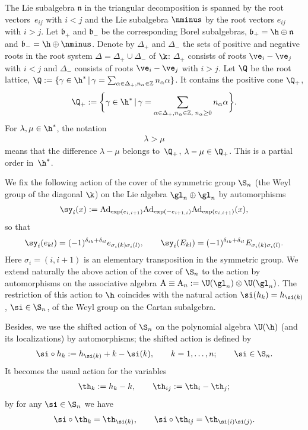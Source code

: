 \documentclass[11pt]{article}
\def\a{\alpha}\def\Ar{{\rm A}}\def\Ab{\bar{\rm A}}\def\b{\beta}\def\bb{\mathfrak{b}}
\def\nplus{\mathfrak{n}}\def\nn{\nonumber}\def\nin{\noindent}
\newcommand{\ZZ}{{\mathbb Z}}\def\Hom{\operatorname{Hom}}\def\I{\mathrm{I}}
\numberwithin{equation}{section}
\begin{document}
The Lie subalgebra $\nplus$ in the triangular decomposition  is spanned by the root vectors~$e_{ij}$ with $i<j$ and the Lie subalgebra $\nminus$ by the
root vectors $e_{ij}$ with $i>j$. Let $\bb_+$ and $\bb_-$
be the corresponding Borel subalgebras, $\bb_+=\h\oplus\nplus$ and $\bb_-=\h\oplus\nminus$. Denote by $\Delta_+$ and $\Delta_-$ the sets of positive and
negative roots in the root system $\Delta=\Delta_+\cup \Delta_-$ of $\k$: $\Delta_+$ consists of roots $\ve_i-\ve_j$ with $i<j$ and $\Delta_-$ consists of roots
$\ve_i-\ve_j$ with $i>j$.
Let $\Q$ be the root lattice, $\Q:=\{\gamma\in\h^*\,|\,\gamma=\sum_{\alpha\in\Delta_+, n_\a\in\ZZ}n_\a \a\}$. It contains the
positive cone $\Q_+$,
\begin{gather*}
\Q_+:=\bigg\{\gamma\in\h^*\,|\,\gamma= \sum_{\alpha\in\Delta_+, n_\a\in\ZZ, \; n_\a\geq 0}n_\a \a\bigg\} .%
\end{gather*}
For $\lambda,\mu\in\h^*$, the notation
\begin{gather}
\lambda>\mu\label{paor}
\end{gather}
means that the dif\/ference $\lambda-\mu$ belongs to~$\Q_+$, $\lambda-\mu\in\Q_+$. This is a partial order in~$\h^*$.


We f\/ix the following action of the cover of the symmetric group $\S_n$ (the Weyl group of the
diagonal $\k$) on the Lie algebra $\gl_n\oplus\gl_n$ by automorphisms
\begin{gather*}
\sy_i(x):=\mathrm{Ad}_{\exp(e_{i,i+1})}\mathrm{Ad}_{\exp(-e_{i+1,i})}\mathrm{Ad}_{\exp(e_{i,i+1})}(x) ,
\end{gather*}
so that
\begin{gather*}\sy_i(e_{kl})=(-1)^{\delta_{ik}+\delta_{il}}e_{\sigma_i(k)\sigma_i(l)} ,
\qquad\sy_i(E_{kl})=(-1)^{\delta_{ik}+\delta_{il}}E_{\sigma_i(k)\sigma_i(l)}.
\end{gather*}
Here $\sigma_i=(i,i+1)$ is an elementary transposition in the symmetric group. We extend naturally the above action of the cover of $\S_n$ to the action by
automorphisms on the associative algebra $\Ar\equiv\Ar_n:=\U(\gl_n)\otimes \U(\gl_n)$. The restriction of this action to $\h$ coincides
with the natural action $\si(h_{k})=h_{\si(k)}$, $\si\in\S_n$,  of the Weyl group on the Cartan subalgebra.


Besides, we use the shifted action of $\S_n$ on the polynomial algebra $\U(\h)$ (and its localizations) by automorphisms; the shifted action is def\/ined by
\begin{gather}
\label{not1}
\si\circ h_k:= h_{\si(k)}+k-\si(k) ,\qquad k=1,\dots ,n;\qquad \si\in\S_n .
\end{gather}
It becomes the usual action for the variables
\begin{gather}
 \th_k:=h_k-k ,\qquad \th_{ij}:=\th_i-\th_j; \label{hrond}
\end{gather}
by  for any $\si\in\S_n$ we have
\begin{gather*}
\si\circ\th_k=\th_{\si(k)} ,\qquad \si\circ\th_{ij}=\th_{\si(i)\si(j)} .
\end{gather*}
\end{document}
